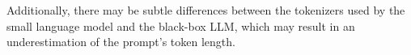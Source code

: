 Additionally, there may be subtle differences between the tokenizers used by the small language model and the black-box LLM, which may result in an underestimation of the prompt's token length.


